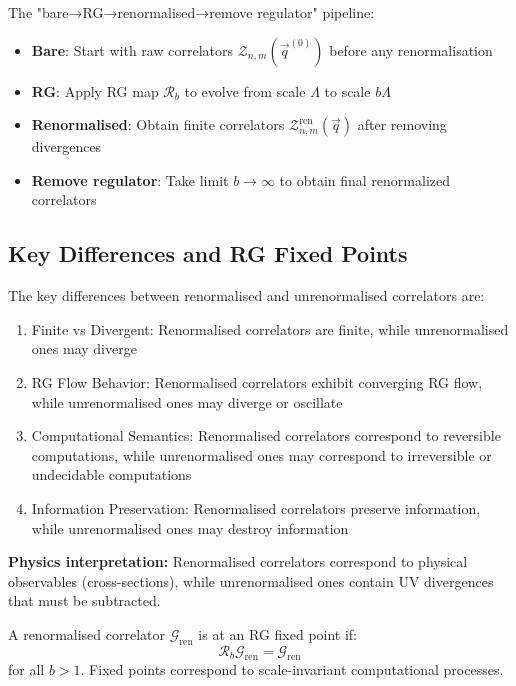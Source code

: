 The "bare→RG→renormalised→remove regulator" pipeline:
\begin{itemize}
\item \textbf{Bare}: Start with raw correlators $\mathcal{Z}_{n,m}(\vec{q}^{(0)})$ before any renormalisation
\item \textbf{RG}: Apply RG map $\mathcal{R}_b$ to evolve from scale $\Lambda$ to scale $b\Lambda$  
\item \textbf{Renormalised}: Obtain finite correlators $\mathcal{Z}_{n,m}^{\text{ren}}(\vec{q})$ after removing divergences
\item \textbf{Remove regulator}: Take limit $b \to \infty$ to obtain final renormalized correlators
\end{itemize}

\subsection{Key Differences and RG Fixed Points}

\begin{proposition}
\label{prop:renormalised-difference}
The key differences between renormalised and unrenormalised correlators are:
\begin{enumerate}
\item Finite vs Divergent: Renormalised correlators are finite, while unrenormalised ones may diverge
\item RG Flow Behavior: Renormalised correlators exhibit converging RG flow, while unrenormalised ones may diverge or oscillate
\item Computational Semantics: Renormalised correlators correspond to reversible computations, while unrenormalised ones may correspond to irreversible or undecidable computations
\item Information Preservation: Renormalised correlators preserve information, while unrenormalised ones may destroy information
\end{enumerate}

\textbf{Physics interpretation:} Renormalised correlators correspond to physical observables (cross-sections), while unrenormalised ones contain UV divergences that must be subtracted.
\end{proposition}

\begin{definition}
\label{def:rg-fixed-points-renorm}
A renormalised correlator $\mathcal{G}_{\text{ren}}$ is at an RG fixed point if:
\[
\mathcal{R}_b \mathcal{G}_{\text{ren}} = \mathcal{G}_{\text{ren}}
\]
for all $b > 1$. Fixed points correspond to scale-invariant computational processes.
\end{definition}

